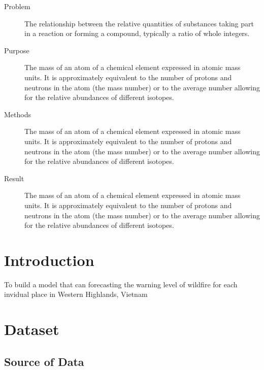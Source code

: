 \documentclass{article}
\begin{document}
\begin{description}
      \item[Problem]
            The relationship between the relative quantities of substances taking part in a reaction or forming a compound, typically a ratio of whole integers.
      \item[Purpose]
            The mass of an atom of a chemical element expressed in atomic mass units. It is approximately equivalent to the number of protons and neutrons in the atom (the mass number) or to the average number allowing for the relative abundances of different isotopes.
      \item[Methods]
            The mass of an atom of a chemical element expressed in atomic mass units. It is approximately equivalent to the number of protons and neutrons in the atom (the mass number) or to the average number allowing for the relative abundances of different isotopes.
      \item[Result]
            The mass of an atom of a chemical element expressed in atomic mass units. It is approximately equivalent to the number of protons and neutrons in the atom (the mass number) or to the average number allowing for the relative abundances of different isotopes.
\end{description}


\section{Introduction}
To build a model that can forecasting the \cite{website:fermentas-lambda} warning level
of wildfire for each invidual place in Western Highlands, Vietnam


\section{Dataset}

\subsection{Source of Data}
\end{document}
